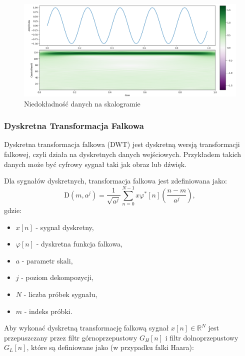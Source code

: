 \begin{figure}[ht]
    \centering
    \begin{minipage}[t]{0.55\linewidth}
        \includegraphics[width=\linewidth]{Rozdziały/02.Podstawy_teoretyczne/Obrazy/skalogram_sinus.png}
        \caption{Niedokładność danych na skalogramie}
        \label{fig:image40}
    \end{minipage}
\end{figure}

\newpage
\subsubsection{Dyskretna Transformacja Falkowa}

Dyskretna transformacja falkowa (DWT) jest dyskretną wersją transformacji falkowej, czyli działa na dyskretnych danych wejściowych. Przykładem takich danych może być cyfrowy sygnał taki jak obraz lub dźwięk. 

Dla sygnałów dyskretnych, transformacja falkowa jest zdefiniowana jako:
\begin{equation*}
    \mathrm{D}\left(m, a^j\right)=\frac{1}{\sqrt{a^j}} \sum_{n=0}^{N-1} x\varphi^*[n] \left(\frac{n-m}{a^j}\right),
\end{equation*}
gdzie:
\begin{itemize}
    \item $x[n]$ - sygnał dyskretny,
    \item $\varphi[n]$ - dyskretna funkcja falkowa,
    \item $a$ - parametr skali,
    \item $j$ - poziom dekompozycji,
    \item $N$ - liczba próbek sygnału,
    \item $m$ - indeks próbki.
\end{itemize}

Aby wykonać dyskretną transformację falkową sygnał $x[n] \in \mathbb{R}^N$ jest przepuszczany przez filtr górnoprzepustowy $G_H[n]$ i filtr dolnoprzepustowy $G_L[n]$, które są definiowane jako (w przypadku falki Haara):


